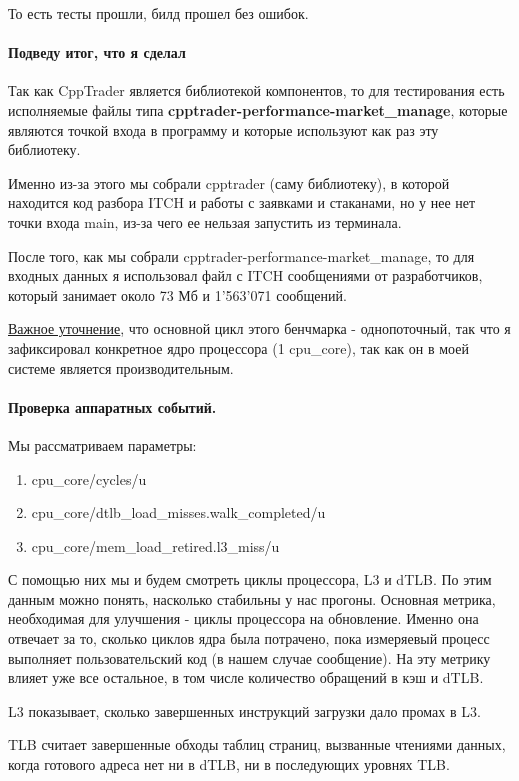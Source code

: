 \documentclass[a4paper,12pt]{article}
\begin{document}
То есть тесты прошли, билд прошел без ошибок.

\paragraph{Подведу итог, что я сделал}
Так как CppTrader является библиотекой компонентов, то для тестирования есть
исполняемые файлы типа \textbf{cpptrader-performance-market\_manage}, которые
являются точкой входа в программу и которые используют как раз эту библиотеку.

Именно из-за этого мы собрали cpptrader (саму библиотеку), в которой находится
код разбора ITCH и работы с заявками и стаканами, но у нее нет точки входа main,
из-за чего ее нельзая запустить из терминала.

После того, как мы собрали cpptrader-performance-market\_manage, то для входных
данных я использовал файл с ITCH сообщениями от разработчиков, который занимает
около 73 Мб и 1'563'071 сообщений.

\underline{Важное уточнение}, что основной цикл этого бенчмарка - однопоточный,
так что я зафиксировал конкретное ядро процессора (1 cpu\_core), так как он в
моей системе является производительным. 

\paragraph{Проверка аппаратных событий.}

Мы рассматриваем параметры:
\begin{enumerate}
    \item cpu\_core/cycles/u
    \item cpu\_core/dtlb\_load\_misses.walk\_completed/u
    \item cpu\_core/mem\_load\_retired.l3\_miss/u 
\end{enumerate}

С помощью них мы и будем смотреть циклы процессора, L3 и dTLB. По этим данным можно понять, 
насколько стабильны у нас прогоны. Основная
метрика, необходимая для улучшения - циклы процессора на обновление. Именно она
отвечает за то, сколько циклов ядра была потрачено, пока измеряевый процесс
выполняет пользовательский код (в нашем случае сообщение). На эту метрику влияет
уже все остальное, в том числе количество обращений в кэш и dTLB.

L3 показывает, сколько завершенных инструкций загрузки дало промах в L3.

TLB считает завершенные обходы таблиц страниц, вызванные чтениями данных, когда
готового адреса нет ни в dTLB, ни в последующих уровнях TLB.
\end{document}
